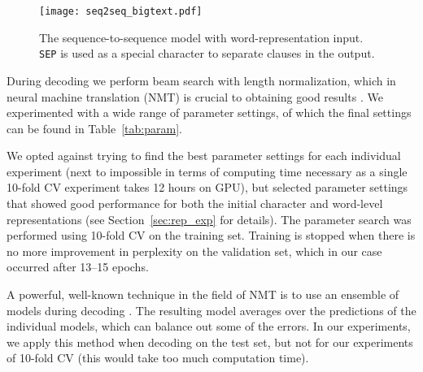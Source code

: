 \documentclass[11pt,a4paper]{article}
\begin{document}
\begin{figure}[!t]
  \centering
  \texttt{[image: seq2seq\_bigtext.pdf]}
  \caption{\label{fig:seq2seq}The sequence-to-sequence model with word-representation input. \texttt{SEP} is used as a special character to separate clauses in the output.}
\end{figure}

During decoding we perform beam search with length normalization, which in neural machine translation (NMT) is crucial to obtaining good results \cite{britz:17}. We experimented with a wide range of parameter settings, of which the final settings can be found in Table~\ref{tab:param}.

We opted against trying to find the best parameter settings for each individual experiment (next to impossible in terms of computing time necessary as a single 10-fold CV experiment takes 12 hours on GPU), but selected parameter settings that showed good performance for both the initial character and word-level representations (see Section~\ref{sec:rep_exp} for details). The parameter search was performed using 10-fold CV on the training set. Training is stopped when there is no more improvement in perplexity on the validation set, which in our case occurred after 13--15 epochs.

A powerful, well-known technique in the field of NMT is to use an ensemble of models during decoding \cite{sutskever:14,sennrich-wmt:16}. The resulting model averages over the predictions of the individual models, which can balance out some of the errors. In our experiments, we apply this method when decoding on the test set, but not for our experiments of 10-fold CV (this would take too much computation time).

\begin{table}[t]
\centering
{}
\caption{Parameters explored during training and testing with their final values. All other parameters have default values.}
\label{tab:param}
\end{table}
\end{document}
